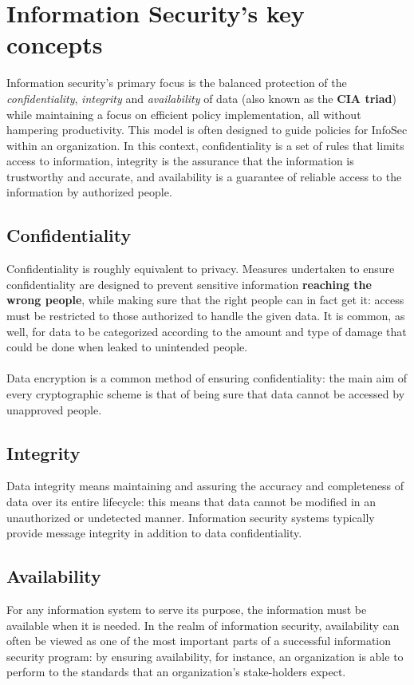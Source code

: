 \documentclass[Lau,binding=0.6cm,oneside]{sapthesis}
\begin{document}
\section{Information Security's key concepts}
Information security's primary focus is the balanced protection of the \textit{confidentiality}, \textit{integrity} and \textit{availability} of data (also known as the \textbf{CIA triad}) while maintaining a focus on efficient policy implementation, all without hampering productivity. This model is often designed to guide policies for InfoSec within an organization. In this context, confidentiality is a set of rules that limits access to information, integrity is the assurance that the information is trustworthy and accurate, and availability is a guarantee of reliable access to the information by authorized people.

\subsection{Confidentiality}
Confidentiality is roughly equivalent to privacy. Measures undertaken to ensure confidentiality are designed to prevent sensitive information \textbf{reaching the wrong people}, while making sure that the right people can in fact get it: access must be restricted to those authorized to handle the given data. It is common, as well, for data to be categorized according to the amount and type of damage that could be done when leaked to unintended people\supercite{confidentiality}.\\\\
Data encryption is a common method of ensuring confidentiality: the main aim of every cryptographic scheme is that of being sure that data cannot be accessed by unapproved people.

\subsection{Integrity}
Data integrity means maintaining and assuring the accuracy and completeness of data over its entire lifecycle: this means that data cannot be modified in an unauthorized or undetected manner\supercite{integrity}. Information security systems typically provide message integrity in addition to data confidentiality.

\subsection{Availability}
For any information system to serve its purpose, the information must be available when it is needed. In the realm of information security, availability can often be viewed as one of the most important parts of a successful information security program: by ensuring availability, for instance, an organization is able to perform to the standards that an organization's stake-holders expect.
\end{document}
